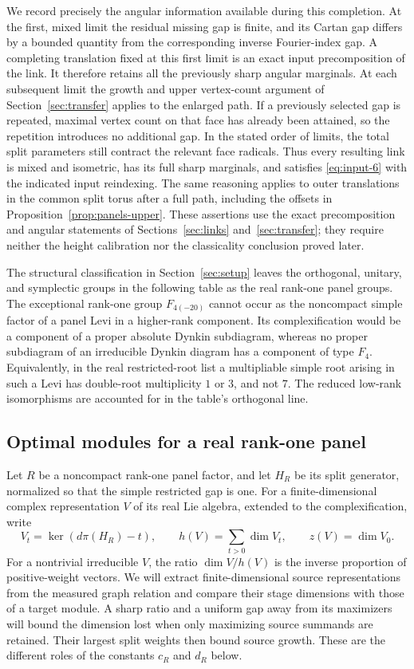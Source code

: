We record precisely the angular information available during this
completion.  At the first, mixed limit the residual missing gap is
finite, and its Cartan gap differs by a bounded quantity from the
corresponding inverse Fourier-index gap.  A completing translation fixed
at this first limit is an exact input precomposition of the link.  It
therefore retains all the previously sharp angular marginals.  At each
subsequent limit the growth and upper vertex-count argument of
Section~\ref{sec:transfer} applies to the enlarged path.  If a previously
selected gap is repeated, maximal vertex count on that face has already
been attained, so the repetition introduces no additional gap.  In the
stated order of limits, the total split parameters still contract the
relevant face radicals.  Thus every resulting link is mixed and
isometric, has its full sharp marginals, and satisfies
\eqref{eq:input-6} with the indicated input reindexing.  The same reasoning
applies to outer translations in the common split torus after a full
path, including the offsets in Proposition~\ref{prop:panels-upper}.
These assertions use the exact precomposition and angular statements of
Sections~\ref{sec:links} and~\ref{sec:transfer}; they require neither the
height calibration nor the classicality conclusion proved later.

The structural classification in Section~\ref{sec:setup} leaves the
orthogonal, unitary, and symplectic groups in the following table as the
real rank-one panel groups.  The exceptional rank-one group
$F_{4(-20)}$ cannot occur as the noncompact simple factor of a panel Levi
in a higher-rank component.  Its complexification would be a component
of a proper absolute Dynkin subdiagram, whereas no proper subdiagram of
an irreducible Dynkin diagram has a component of type $F_4$.  Equivalently,
in the real restricted-root list a multipliable simple root arising in
such a Levi has double-root multiplicity $1$ or $3$, and not $7$.
The reduced low-rank isomorphisms are accounted for in the table's
orthogonal line.

\subsection{Optimal modules for a real rank-one panel}

Let $R$ be a noncompact rank-one panel factor, and let $H_R$ be its
split generator, normalized so that the simple restricted gap is one.
For a finite-dimensional complex representation $V$ of its real Lie
algebra, extended to the complexification, write
\[
 V_t=\ker(d\pi(H_R)-t),\qquad
 h(V)=\sum_{t>0}\dim V_t,\qquad z(V)=\dim V_0.
\]
For a nontrivial irreducible $V$, the ratio $\dim V/h(V)$ is the
inverse proportion of positive-weight vectors.  We will extract finite-dimensional
source representations from the measured graph relation and compare their
stage dimensions with those of a target module.  A sharp ratio and a uniform
gap away from its maximizers will bound the dimension lost when only
maximizing source summands are retained.  Their largest split weights then
bound source growth.  These are the different roles of the constants
$c_R$ and $d_R$ below.

